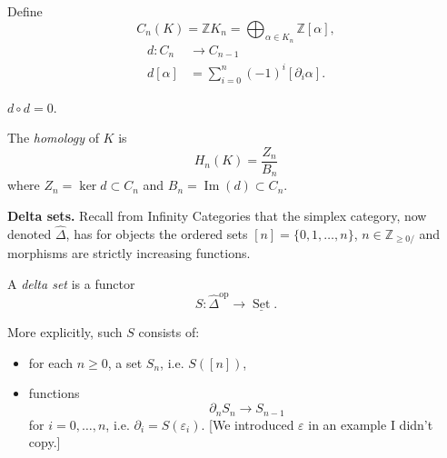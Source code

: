 Define 
$$
C_n(K) = \mathbb{Z}K_n
= \bigoplus_{\alpha \in
K_n}\mathbb{Z}[\alpha],
$$
$$
\begin{aligned}
d: C_n &\longrightarrow C_{n-1} \\
d[\alpha] &= \sum_{i=0}^n
(-1)^i[\partial_i\alpha].
\end{aligned}
$$
\begin{exercise}
\label{exercise-d2=0}
$d \circ d =0$.
\end{exercise}

\begin{definition}
\label{definition-simplicial-homology}
The {\it homology} of $K$ is
$$
H_n(K) = \frac{Z_n}{B_n}
$$
where $Z_n = \ker d \subset C_n$
and $B_n = \operatorname{Im}(d) \subset
C_n$.
\end{definition}

\medskip\noindent
{\bf Delta sets.}
Recall from Infinity Categories
that the simplex category, now denoted
$\hat{\Delta}$, has for objects the
ordered sets
$[n] = \{0,1,\dots,n\}$,
$n \in \mathbb{Z}_{\geq 0/}$ and morphisms are
strictly
increasing functions.

\begin{definition}
\label{definition-delta-set}
A {\it delta set} is a functor
$$
S : \hat{\Delta}^{\mathrm{op}}
\to \underline{\operatorname{Set}}.
$$
\end{definition}

\noindent
More explicitly, such $S$ consists
of:
\begin{itemize}
\item for each $n \geq 0$,
a set $S_n$, i.e. $S([n])$,
\item functions
$$
\partial_n S_n \to S_{n-1}
$$
for $i = 0,\dots,n$, i.e. $\partial_i =
S(\varepsilon_i)$. [We introduced $\varepsilon$
in an example I didn't copy.]
\end{itemize}

